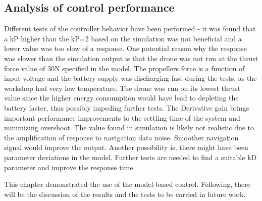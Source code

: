 \subsection{Analysis of control performance}

Different tests of the controller behavior have been performed - it was found that a kP higher than the kP=2 based on the simulation was not beneficial and a lower value was too slow of a response. 
One potential reason why the response was slower than the simulation output is that the drone was not run at the thrust force value of 30N specified in the model. The propellers force is a function of input voltage and the battery supply was discharging fast during the tests, as the workshop had very low temperature. The drone was run on its lowest thrust value since the higher energy consumption would have lead to depleting the battery faster, thus possibly impeding further tests. 
The Derivative gain brings important performance improvements to the settling time of the system and minimizing overshoot. The value found in simulation is likely not realistic due to the amplification of response to navigation data noise. Smoother navigation signal would improve the output. Another possibility is, there might have been parameter deviations in the model. Further tests are needed to find a suitable kD parameter and improve the response time. 



This chapter demonstrated the use of the model-based control. Following, there will be the discussion of the results and the tests to be carried in future work. 
